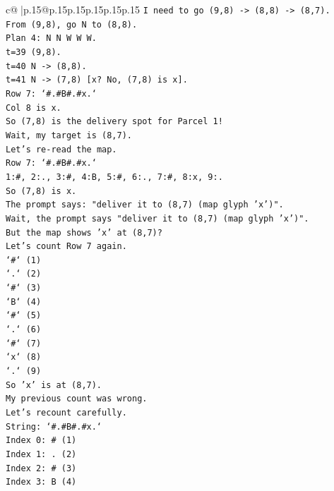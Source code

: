 \documentclass{article}
\begin{document}
{\begin{supertabular}{c@{$\;$}|p{.15\linewidth}@{}p{.15\linewidth}p{.15\linewidth}p{.15\linewidth}p{.15\linewidth}p{.15\linewidth}}
{{{\texttt{I need to go (9,8) {-}> (8,8) {-}> (8,7).} \\
\texttt{From (9,8), go N to (8,8).} \\
\texttt{Plan 4: N N W W W.} \\
\texttt{t=39 (9,8).} \\
\texttt{t=40 N {-}> (8,8).} \\
\texttt{t=41 N {-}> (7,8) {[}x? No, (7,8) is x{]}.} \\
\texttt{Row 7: `\#.\#B\#.\#x.`} \\
\texttt{Col 8 is x.} \\
\texttt{So (7,8) is the delivery spot for Parcel 1!} \\
\texttt{Wait, my target is (8,7).} \\
\texttt{Let's re{-}read the map.} \\
\texttt{Row 7: `\#.\#B\#.\#x.`} \\
\texttt{1:\#, 2:., 3:\#, 4:B, 5:\#, 6:., 7:\#, 8:x, 9:.} \\
\texttt{So (7,8) is x.} \\
\texttt{The prompt says: "deliver it to (8,7) (map glyph 'x')".} \\
\texttt{Wait, the prompt says "deliver it to (8,7) (map glyph 'x')".} \\
\texttt{But the map shows 'x' at (8,7)?} \\
\texttt{Let's count Row 7 again.} \\
\texttt{`\#` (1)} \\
\texttt{`.` (2)} \\
\texttt{`\#` (3)} \\
\texttt{`B` (4)} \\
\texttt{`\#` (5)} \\
\texttt{`.` (6)} \\
\texttt{`\#` (7)} \\
\texttt{`x` (8)} \\
\texttt{`.` (9)} \\
\texttt{So 'x' is at (8,7).} \\
\texttt{My previous count was wrong.} \\
\texttt{Let's recount carefully.} \\
\texttt{String: `\#.\#B\#.\#x.`} \\
\texttt{Index 0: \# (1)} \\
\texttt{Index 1: . (2)} \\
\texttt{Index 2: \# (3)} \\
\texttt{Index 3: B (4)} \\
}}}
\end{supertabular}}
\end{document}
